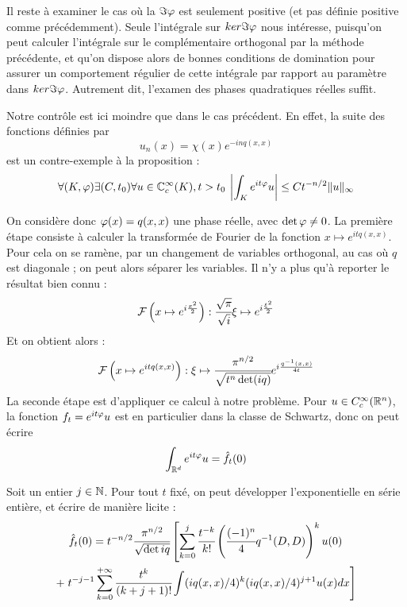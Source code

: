 Il reste à examiner le cas où la $\Im \varphi$ est seulement positive (et pas définie positive comme précédemment). Seule l'intégrale sur $ker \Im \varphi$ nous intéresse, puisqu'on peut calculer l'intégrale sur le complémentaire orthogonal par la méthode précédente, et qu'on dispose alors de bonnes conditions de domination pour assurer un comportement régulier de cette intégrale par rapport au paramètre dans $ker \Im \varphi$. Autrement dit, l'examen des phases quadratiques réelles suffit.

Notre contrôle est ici moindre que dans le cas précédent. En effet, la suite des fonctions définies par
\begin{equation*}
  u_n(x)=\chi(x)e^{-inq(x,x)}
\end{equation*}
est un contre-exemple à la proposition :
\begin{equation*}
  \forall (K,\varphi) \exists (C,t_0) \forall u \in \mathbb{C}^{\infty}_c(K),t>t_0\: \left|\int_Ke^{it\varphi}u\right| \leq Ct^{-n/2}\|u\|_{\infty}
\end{equation*}

On considère donc $\varphi(x)=q(x,x)$ une phase réelle, avec $\det \varphi \neq 0$. La première étape consiste à calculer la transformée de Fourier de la fonction $x\mapsto e^{itq(x,x)}$. Pour cela on se ramène, par un changement de variables orthogonal, au cas où $q$ est diagonale ; on peut alors séparer les variables. Il n'y a plus qu'à reporter le résultat bien connu :
\begin{equation*}
  \mathcal{F}\left(x\mapsto e^{i\frac{x^2}{2}}\right) : \cfrac{\sqrt{\pi}}{\sqrt{i}}\xi \mapsto e^{i\frac{\xi^2}{2}}
\end{equation*}
\noindent Et on obtient alors :
\begin{equation*}
  \mathcal{F}\left(x\mapsto e^{itq(x,x)}\right) : \xi \mapsto \cfrac{\pi^{n/2}}{\sqrt{t^n \det (iq)}}e^{i\frac{q^{-1}(x,x)}{4t}}
\end{equation*}
La seconde étape est d'appliquer ce calcul à notre problème. Pour $u \in C^{\infty}_c(\mathbb{R}^n)$, la fonction $f_t=e^{it\varphi}u$ est en particulier dans la classe de Schwartz, donc on peut écrire
\begin{equation*}
  \int_{\mathbb{R}^d}e^{it\varphi}u = \hat{f_t}(0)
\end{equation*}

Soit un entier $j \in \mathbb{N}$. Pour tout $t$ fixé, on peut développer l'exponentielle en série entière, et écrire de manière licite :
\begin{multline*}
  \hat{f_t}(0)=t^{-n/2}\cfrac{\pi^{n/2}}{\sqrt{\det{iq}}}\left[\sum_{k=0}^{j}\cfrac{t^{-k}}{k!}\left(\cfrac{(-1)^n}{4}q^{-1}(D,D)\right)^ku(0)\right. \\+ \left.t^{-j-1}\sum_{k=0}^{+\infty}\cfrac{t^k}{(k+j+1)!}\int (iq(x,x)/4)^k(iq(x,x)/4)^{j+1}u(x)dx\right]
\end{multline*}

